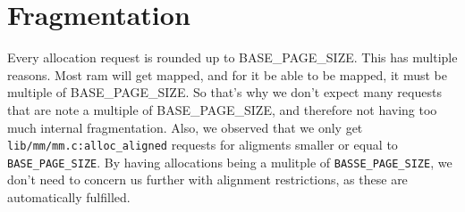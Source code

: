 % 
% 
% 
% 
% 

\section{Fragmentation}

Every allocation request is rounded up to BASE\_PAGE\_SIZE.
This has multiple reasons.
Most ram will get mapped, and for it be able to be mapped, it must be multiple
of BASE\_PAGE\_SIZE.
So that's why we don't expect many requests that are note a multiple of
BASE\_PAGE\_SIZE, and therefore not having too much internal fragmentation.
Also, we observed that we only get \verb|lib/mm/mm.c:alloc_aligned| requests for
aligments smaller or equal to \verb|BASE_PAGE_SIZE|.
By having allocations being a mulitple of \verb|BASSE_PAGE_SIZE|, we don't
need to concern us further with alignment restrictions, as these are
automatically fulfilled.

